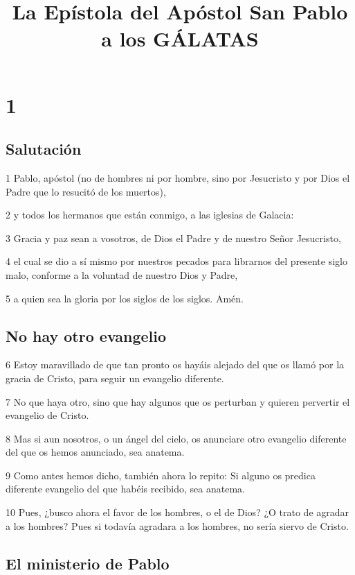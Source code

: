 
\title{La Epístola del Apóstol San Pablo a los GÁLATAS}

\chapter{1}

\section*{Salutación}

\par 1 Pablo, apóstol (no de hombres ni por hombre, sino por Jesucristo y por Dios el Padre que lo resucitó de los muertos),
\par 2 y todos los hermanos que están conmigo, a las iglesias de Galacia:
\par 3 Gracia y paz sean a vosotros, de Dios el Padre y de nuestro Señor Jesucristo,
\par 4 el cual se dio a sí mismo por nuestros pecados para librarnos del presente siglo malo, conforme a la voluntad de nuestro Dios y Padre,
\par 5 a quien sea la gloria por los siglos de los siglos. Amén.

\section*{No hay otro evangelio}

\par 6 Estoy maravillado de que tan pronto os hayáis alejado del que os llamó por la gracia de Cristo, para seguir un evangelio diferente.
\par 7 No que haya otro, sino que hay algunos que os perturban y quieren pervertir el evangelio de Cristo.
\par 8 Mas si aun nosotros, o un ángel del cielo, os anunciare otro evangelio diferente del que os hemos anunciado, sea anatema.
\par 9 Como antes hemos dicho, también ahora lo repito: Si alguno os predica diferente evangelio del que habéis recibido, sea anatema.
\par 10 Pues, ¿busco ahora el favor de los hombres, o el de Dios? ¿O trato de agradar a los hombres? Pues si todavía agradara a los hombres, no sería siervo de Cristo.

\section*{El ministerio de Pablo}

